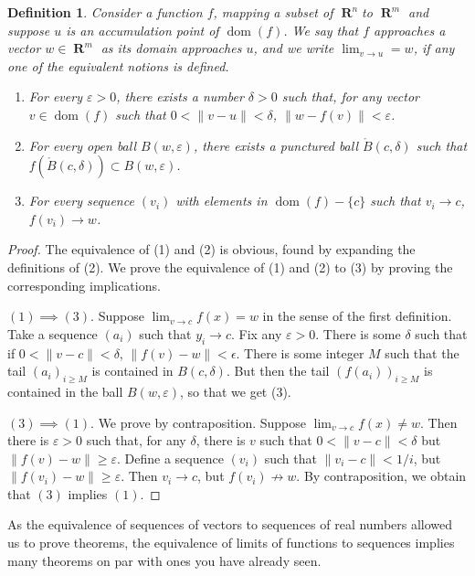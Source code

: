 \documentclass{report}
\newtheorem{definition}{Definition}
\DeclareMathOperator{\real}{\mathbf{R}}
\DeclareMathOperator{\dom}{dom}
\begin{document}
\begin{definition}
  Consider a function $f$, mapping a subset of $\real^n$to $\real^m$ and suppose $u$ is an accumulation point of $\dom(f)$. We say that $f$ approaches a vector $w \in \real^m$ as its domain approaches $u$, and we write $\lim_{v \to u} = w$, if any one of the equivalent notions is defined.

  \begin{enumerate}
    \item For every $\varepsilon > 0$, there exists a number $\delta > 0$ such that, for any vector $v \in \dom(f)$ such that $0 < \|v - u \| < \delta$, $\|w - f(v)\| < \varepsilon$.
    \item For every open ball $B(w,\varepsilon)$, there exists a punctured ball $\mathring{B}(c,\delta)$ such that $f(\mathring{B}(c,\delta)) \subset B(w,\varepsilon)$.
    \item For every sequence $(v_i)$ with elements in $\dom(f) - \{ c \}$ such that $v_i \to c$, $f(v_i) \to w$.
  \end{enumerate}
\end{definition}
\begin{proof}
  The equivalence of (1) and (2) is obvious, found by expanding the definitions of (2). We prove the equivalence of (1) and (2) to (3) by proving the corresponding implications.

  $(1) \implies (3)$. Suppose $\lim_{v \to c} f(x) = w$ in the sense of the first definition. Take a sequence $(a_i)$ such that $y_i \to c$. Fix any $\varepsilon > 0$. There is some $\delta$ such that if $0 < \| v - c \| < \delta$, $\| f(v) - w \| < \epsilon$. There is some integer $M$ such that the tail $(a_i)_{i \geq M}$ is contained in $B(c,\delta)$. But then the tail $(f(a_i))_{i \geq M}$ is contained in the ball $B(w,\varepsilon)$, so that we get (3).

  $(3) \implies (1)$. We prove by contraposition. Suppose $\lim_{v \to c} f(x) \neq w$. Then there is $\varepsilon > 0$ such that, for any $\delta$, there is $v$ such that $0 < \|v - c\| < \delta$ but $\| f(v) - w \| \geq \varepsilon$. Define a sequence $(v_i)$ such that $\| v_i - c \| < 1/i$, but $\| f(v_i) - w \| \geq \varepsilon$. Then $v_i \to c$, but $f(v_i) \not \to w$. By contraposition, we obtain that $(3)$ implies $(1)$.
\end{proof}

As the equivalence of sequences of vectors to sequences of real numbers allowed us to prove theorems, the equivalence of limits of functions to sequences implies many theorems on par with ones you have already seen.
\end{document}
